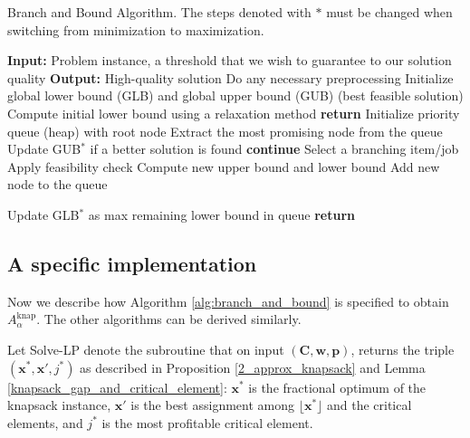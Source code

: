 \documentclass[a4paper,UKenglish,cleveref, autoref, thm-restate, pdfa]{lipics-v2021}
\theoremstyle{plain}
\begin{document}
\begin{algorithm}
\caption{Branch and Bound Algorithm. The steps denoted with $*$ must be changed when switching from minimization to maximization. }
\label{alg:branch_and_bound}
\begin{algorithmic}[1]
    \State \textbf{Input:} Problem instance, a threshold that we wish to guarantee to our solution quality
    \State \textbf{Output:} High-quality solution
    \State Do any necessary preprocessing
    \State Initialize global lower bound (GLB) and global upper bound (GUB) (best feasible solution)
    \State Compute initial lower bound using a relaxation method
        \textbf{return}
    \EndIf
    \State Initialize priority queue (heap) with root node
        \State Extract the most promising node from the queue
            \State Update GUB$^*$ if a better solution is found
            \State \textbf{continue}
        \EndIf
        \State Select a branching item/job
            \State Apply feasibility check
            \State Compute new upper bound and lower bound
                \State Add new node to the queue
            \EndIf
        \EndFor

        \State Update GLB$^*$ as max remaining lower bound in queue
            \State \textbf{return}
        \EndIf
    \EndWhile
\end{algorithmic}
\end{algorithm}














\subsection{A specific implementation}

Now we describe how Algorithm \ref{alg:branch_and_bound} is specified to obtain $A^{\text{knap}}_{\alpha}$. The other algorithms can be derived similarly.

Let Solve-LP denote the subroutine that on input $(\bm{C}, \bm{w}, \bm{p})$, returns the triple $(\bm{x}^*, \bm{x'}, j^*)$ as described in Proposition \ref{2_approx_knapsack} and Lemma \ref{knapsack_gap_and_critical_element}: 
$\bm{x^*}$ is the fractional optimum of the knapsack instance, $\bm{x}'$ is the best assignment among $\lfloor\bm{x}^*\rfloor$ and the critical elements, and $j^*$ is the most profitable critical element.
\end{document}
